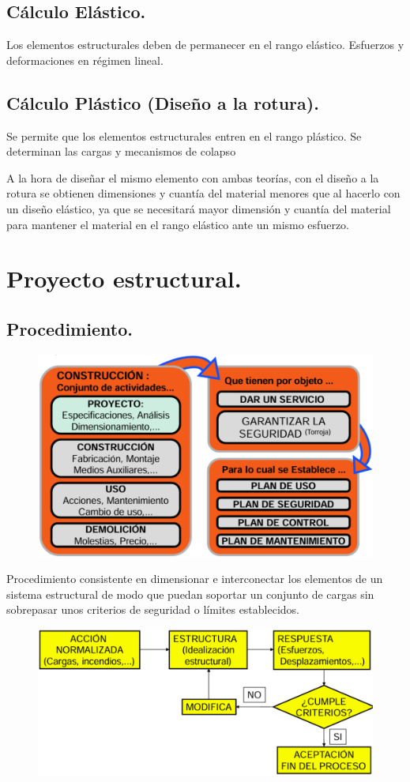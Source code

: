 \subsection{Cálculo Elástico.}
Los elementos estructurales deben de permanecer en el rango elástico. Esfuerzos y deformaciones en régimen lineal.

\subsection{Cálculo Plástico (Diseño a la rotura).}
Se permite que los elementos estructurales entren en el rango plástico. Se determinan las cargas y mecanismos de colapso

A la hora de diseñar el mismo elemento con ambas teorías, con el diseño a la rotura se obtienen dimensiones y cuantía del material menores que al hacerlo con un diseño elástico, ya que se necesitará mayor dimensión y cuantía del material para mantener el material en el rango elástico ante un mismo esfuerzo.

\section{Proyecto estructural.}
\subsection{Procedimiento.}
\begin{figure}[h]
    \centering
    \includegraphics[width=0.75\linewidth]{Imagenes/Proyecto estructural. Procedimiento.png}
\end{figure}

Procedimiento consistente en dimensionar e interconectar los elementos de un sistema estructural de modo que puedan soportar un conjunto de cargas sin sobrepasar unos criterios de seguridad o límites establecidos.

\begin{figure}[h]
    \centering
    \includegraphics[width=0.75\linewidth]{Imagenes/Proyecto estructural. Procedimiento (1).png}

\end{figure}

